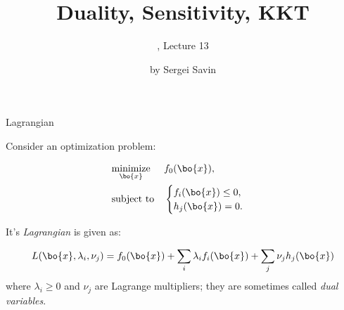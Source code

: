 \documentclass{beamer}
\title{Duality, Sensitivity, KKT}
\subtitle{\mycoursetitle, Lecture 13}
\author{by Sergei Savin}
\date{\mydate}
\begin{document}
\maketitle


%
%







\begin{frame}{Lagrangian}
	\begin{flushleft}
		
		Consider an optimization problem:
		
		\begin{equation}
			\begin{aligned}
				& \underset{\bo{x}}{\text{minimize}}
				& & f_0(\bo{x}), \\
				& \text{subject to}
				& & \begin{cases}
					f_i(\bo{x}) \leq 0, \\
					h_j(\bo{x}) = 0.
				\end{cases}
			\end{aligned}
		\end{equation}
		
		It's \emph{Lagrangian} is given as:
		
		\begin{equation}
			L(\bo{x}, \lambda_i, \nu_j) = 
			f_0(\bo{x}) + 
			\sum\limits_i \lambda_i f_i(\bo{x}) +
			\sum\limits_j \nu_j h_j(\bo{x})
		\end{equation}
	where $\lambda_i \geq 0$ and $\nu_j$ are Lagrange multipliers; they are sometimes called \emph{dual variables}.
		
	\end{flushleft}
\end{frame}
\end{document}
